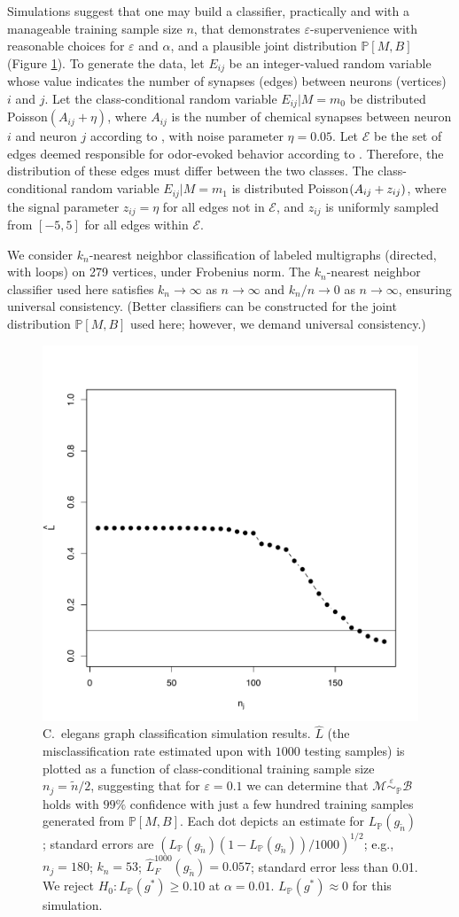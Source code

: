 \documentclass{article}
\newcommand{\mB}{\mathcal{B}}
\newcommand{\mM}{\mathcal{M}}
\newcommand{\PP}{\mathbb{P}}           %
\providecommand{\mc}[1]{\mathcal{#1}}
\providecommand{\mt}[1]{\widetilde{#1}}
\newcommand{\hL}{\widehat{L}}
\newcommand{\MeB}{\mM \overset{\varepsilon}{{\sim}}_{\PP} \mB}
\providecommand{\tr}[1]{\textcolor{black}{#1}}
\begin{document}
Simulations suggest that one may build a classifier, practically and with a manageable training sample size $n$, that demonstrates $\varepsilon$-supervenience with reasonable choices for $\varepsilon$ and $\alpha$, and a plausible joint distribution $\PP[M,B]$ (Figure \ref{fig1}). To generate the data, let $E_{ij}$ be an integer-valued random variable whose value indicates the number of synapses (edges) between neurons (vertices) $i$ and $j$.  Let the class-conditional random variable $E_{ij} | M=m_0$  be distributed Poisson$(A_{ij}+\eta)$, where $A_{ij}$ is the number of chemical synapses between neuron $i$ and neuron $j$ according to \cite{VarshneyChklovskii09}, with noise parameter $\eta=0.05$.  Let $\mc{E}$ be the set of edges deemed responsible for odor-evoked behavior according to \cite{ChalasaniBargmann07}.  Therefore, the distribution of these edges must differ between the two classes.  The class-conditional random variable $E_{ij} | M=m_1$ is distributed Poisson$(A_{ij}+ \tr{z_{ij}})$, where the signal parameter $z_{ij}=\eta$ for all edges not in $\mc{E}$, and $z_{ij}$ is uniformly sampled from $[-5,5]$ for all edges within $\mc{E}$.

We consider $k_n$-nearest neighbor classification of labeled multigraphs (directed, with loops) on 279 vertices, under Frobenius norm. The $k_n$-nearest neighbor classifier used here satisfies $k_n \rightarrow \infty$ as $n \rightarrow \infty$ and $k_n/n \rightarrow 0$ as $n \rightarrow \infty$, ensuring universal consistency. (Better classifiers can be constructed for the joint distribution $\PP[M,B]$ used here; however, we demand universal consistency.)

\begin{figure}[!ht]
\centering \includegraphics[width=.5\linewidth]{Lhatplot}
\caption{C.~elegans graph classification simulation results.  $\hL$  (the misclassification rate estimated upon with $1000$ testing samples) %
is plotted as a function of class-conditional training sample size $n_j=\mt{n}/2$, suggesting that for $\varepsilon=0.1$ we can determine that $\MeB$ holds with $99\%$ confidence with just a few hundred training samples generated from $\PP[M,B]$. Each dot depicts an estimate for $L_{\PP}(g_{\mt{n}})$; standard errors are $(L_{\PP}(g_{\mt{n}})(1-L_{\PP}(g_{\mt{n}}))/1000)^{1/2}$\tr{; e}.g., $n_j = 180$; $k_n = 53$; $\hL^{1000}_{F}(g_{\mt{n}}) = 0.057$; standard error less than 0.01. We reject $H_0: L_{\PP}(g^*) \geq 0.10$ at $\alpha=0.01$. $L_{\PP}(g^*) \approx 0$ for this simulation.
}
\label{fig1}
\end{figure}
\end{document}
